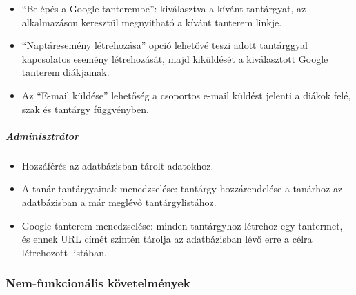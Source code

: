 \documentclass[12pt]{article}
\numberwithin{figure}{section}
\numberwithin{equation}{section}
\begin{document}
\begin{itemize}
	\item {\enquote{Belépés a Google tanterembe}: kiválasztva a kívánt tantárgyat, az alkalmazáson keresztül megnyitható a kívánt tanterem linkje.}
	\item {\enquote{Naptáresemény létrehozása} opció lehetővé teszi adott tantárggyal kapcsolatos esemény létrehozását, majd kiküldését a kiválasztott Google tanterem diákjainak.}
	\item {Az \enquote{E-mail küldése} lehetőség a csoportos e-mail küldést jelenti a diákok felé, szak és tantárgy függvényben.}\\
\end{itemize}

\subparagraph*{Adminisztrátor}
\begin{itemize}
	\item{Hozzáférés az adatbázisban tárolt adatokhoz.}
	\item{A tanár tantárgyainak menedzselése: tantárgy hozzárendelése a tanárhoz az adatbázisban a már meglévő tantárgylistához.}
	\item{Google tanterem menedzselése: minden tantárgyhoz létrehoz egy tantermet, és ennek URL címét szintén tárolja az adatbázisban lévő erre a célra létrehozott listában.}\\
\end{itemize}


\subsubsection{Nem-funkcionális követelmények}
\end{document}
